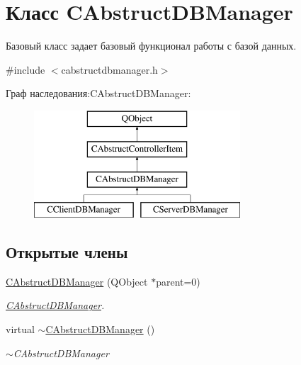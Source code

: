 \hypertarget{class_c_abstruct_d_b_manager}{}\section{Класс C\+Abstruct\+D\+B\+Manager}
\label{class_c_abstruct_d_b_manager}


Базовый класс задает базовый функционал работы с базой данных.  




{\ttfamily \#include $<$cabstructdbmanager.\+h$>$}

Граф наследования\+:C\+Abstruct\+D\+B\+Manager\+:\begin{figure}[H]
\begin{center}
\leavevmode
\includegraphics[height=4.000000cm]{class_c_abstruct_d_b_manager}
\end{center}
\end{figure}
\subsection*{Открытые члены}
\begin{DoxyCompactItemize}
\item 
\hyperlink{class_c_abstruct_d_b_manager_a53c2018cfa7a1a24bacd747967509bd7}{C\+Abstruct\+D\+B\+Manager} (Q\+Object $\ast$parent=0)
\begin{DoxyCompactList}\small\item\em \hyperlink{class_c_abstruct_d_b_manager}{C\+Abstruct\+D\+B\+Manager}. \end{DoxyCompactList}\item 
\hypertarget{class_c_abstruct_d_b_manager_a75785e87f1f6dcb6cc2d48d4eced257b}{}\label{class_c_abstruct_d_b_manager_a75785e87f1f6dcb6cc2d48d4eced257b} 
virtual \hyperlink{class_c_abstruct_d_b_manager_a75785e87f1f6dcb6cc2d48d4eced257b}{$\sim$\+C\+Abstruct\+D\+B\+Manager} ()
\begin{DoxyCompactList}\small\item\em $\sim$\+C\+Abstruct\+D\+B\+Manager \end{DoxyCompactList}\end{DoxyCompactItemize}
